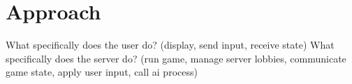 \documentclass{standalone}
\begin{document}
	\section{Approach}
		What specifically does the user do? (display, send input, receive state)
		What specifically does the server do? (run game, manage server lobbies, communicate game state, apply user input, call ai process)
\end{document}
